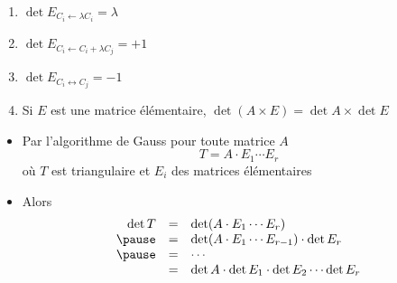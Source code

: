 \begin{frame}

\begin{proposition}
\begin{enumerate}
  \item\pause $\det E_{C_i \leftarrow \lambda C_i} = \lambda$
  \item\pause $\det E_{C_i \leftarrow C_i+\lambda C_j} = +1$
  \item\pause $\det E_{C_i \leftrightarrow C_j} = -1$
  \item\pause Si $E$ est une matrice élémentaire, $\det \left( A \times E \right) = \det A \times \det E$
\end{enumerate}  
\end{proposition}

\begin{itemize}
  \item\pause Par l'algorithme de Gauss pour toute matrice $A$ \pause
\[
T = A  \cdot E_1 \cdots E_r
\]
où $T$ est triangulaire et $E_i$ des matrices élémentaires
  \item\pause Alors
  $$
\begin{array}{rcl}
\det T 
  &=& \det (A \cdot E_1 \cdots E_r) \\
\pause  &=& \det (A \cdot E_1 \cdots E_{r-1})\cdot \det E_r \\
\pause  &=& \cdots \\
  &=& \det A \cdot \det E_1\cdot \det E_2 \cdots \det E_r
\end{array}
$$
\end{itemize}

\end{frame}


